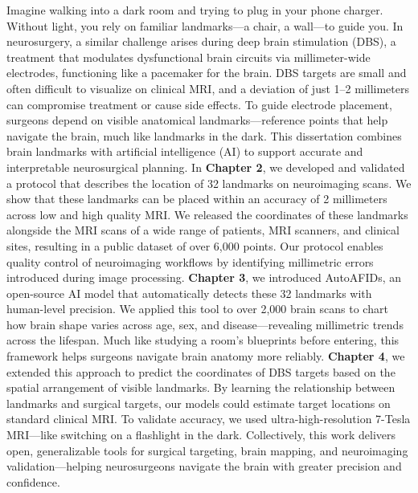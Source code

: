 \onehalfspacing
Imagine walking into a dark room and trying to plug in your phone charger. Without light, you rely on familiar landmarks—a chair, a wall—to guide you. In neurosurgery, a similar challenge arises during deep brain stimulation (DBS), a treatment that modulates dysfunctional brain circuits via millimeter-wide electrodes, functioning like a pacemaker for the brain. DBS targets are small and often difficult to visualize on clinical MRI, and a deviation of just 1–2 millimeters can compromise treatment or cause side effects. To guide electrode placement, surgeons depend on visible anatomical landmarks—reference points that help navigate the brain, much like landmarks in the dark. This dissertation combines brain landmarks with artificial intelligence (AI) to support accurate and interpretable neurosurgical planning. In \textbf{Chapter 2}, we developed and validated a protocol that describes the location of 32 landmarks on neuroimaging scans. We show that these landmarks can be placed within an accuracy of 2 millimeters across low and high quality MRI. We released the coordinates of these landmarks alongside the MRI scans of a wide range of patients, MRI scanners, and clinical sites, resulting in a public dataset of over 6,000 points. Our protocol enables quality control of neuroimaging workflows by identifying millimetric errors introduced during image processing. \textbf{Chapter 3}, we introduced AutoAFIDs, an open-source AI model that automatically detects these 32 landmarks with human-level precision. We applied this tool to over 2,000 brain scans to chart how brain shape varies across age, sex, and disease—revealing millimetric trends across the lifespan. Much like studying a room’s blueprints before entering, this framework helps surgeons navigate brain anatomy more reliably. \textbf{Chapter 4}, we extended this approach to predict the coordinates of DBS targets based on the spatial arrangement of visible landmarks. By learning the relationship between landmarks and surgical targets, our models could estimate target locations on standard clinical MRI. To validate accuracy, we used ultra-high-resolution 7-Tesla MRI—like switching on a flashlight in the dark. Collectively, this work delivers open, generalizable tools for surgical targeting, brain mapping, and neuroimaging validation—helping neurosurgeons navigate the brain with greater precision and confidence.

